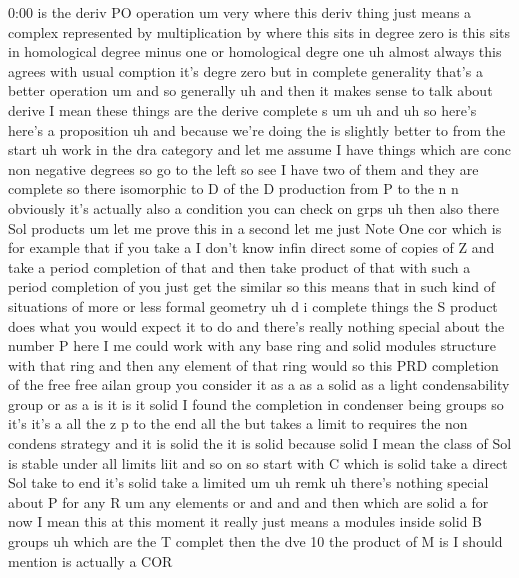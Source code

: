 \begin{unfinished}{0:00}
is  the  deriv  PO  operation
um  very  where  this  deriv  thing  just
means  a  complex  represented  by
multiplication  by  where  this  sits  in
degree  zero  is  this  sits  in  homological
degree  minus  one  or  homological  degre
one
uh  almost  always  this  agrees  with  usual
comption  it's  degre  zero  but  in  complete
generality  that's  a  better  operation  um
and  so  generally  uh  and  then  it  makes
sense  to  talk  about  derive  I  mean  these
things  are  the  derive  complete  s
um  uh
and  uh  so  here's  here's  a
proposition
uh  and  because  we're  doing  the  is
slightly  better  to  from  the  start  uh
work  in  the  dra  category  and  let  me
assume  I  have  things  which  are  conc  non
negative  degrees  so  go  to  the
left  so  see  I  have  two  of
them  and  they  are
complete
so  there  isomorphic
to  D  of  the  D  production  from  P  to  the
n  n  obviously  it's  actually  also  a
condition  you  can  check  on
grps
uh
then  also  there  Sol
products
um  let  me  prove  this  in  a  second  let  me
just  Note  One  cor  which  is  for  example
that  if  you  take  a  I  don't  know  infin
direct  some  of  copies  of  Z  and  take  a
period  completion  of  that  and  then  take
product  of  that  with  such  a  period
completion
of  you  just  get  the
similar
so  this  means  that  in  such  kind  of
situations  of  more  or  less  formal
geometry
uh  d  i  complete  things  the  S  product
does  what  you  would  expect  it  to
do  and  there's  really  nothing  special
about  the  number  P  here  I  me  could  work
with  any  base  ring  and  solid  modules
structure  with  that  ring  and  then  any
element  of  that  ring
would  so  this  PRD  completion  of  the  free
free  ailan  group  you  consider  it  as  a  as
a  solid  as  a  light  condensability  group
or  as  a  is  it  is  it  solid  I  found  the
completion  in  condenser  being  groups  so
it's  it's  a  all  the  z  p  to  the  end  all
the
but  takes  a  limit  to  requires  the  non
condens
strategy  and  it  is  solid  the  it  is  solid
because  solid  I  mean  the  class  of  Sol  is
stable  under  all  limits  liit  and  so  on
so  start  with  C  which  is  solid  take  a
direct  Sol  take  to  end  it's  solid  take  a
limited  um  uh  remk
uh  there's  nothing  special  about
P  for  any
R
um  any  elements
or
and  and  and  then  which  are
solid  a  for  now  I  mean  this  at  this
moment  it  really  just  means  a  modules
inside  solid  B
groups  uh  which  are  the  T
complet
then  the  dve  10  the  product  of
M
is  I  should  mention  is  actually  a  COR

\end{unfinished}
